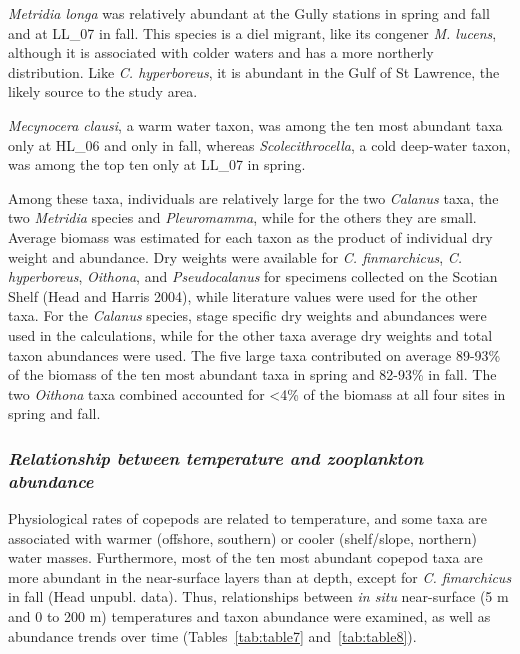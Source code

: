 \documentclass[12pt]{article}\usepackage[]{graphicx}\usepackage[]{color}
\begin{document}
\emph{Metridia longa} was relatively abundant at the Gully stations in spring and fall and at LL\_07 in fall. This species is a diel migrant, like its congener \emph{M. lucens}, although it is associated with colder waters and has a more northerly distribution. Like \emph{C. hyperboreus}, it is abundant in the Gulf of St Lawrence, the likely source to the study area.

\emph{Mecynocera clausi}, a warm water taxon, was among the ten most abundant taxa only at HL\_06 and only in fall, whereas \emph{Scolecithrocella}, a cold deep-water taxon, was among the top ten only at LL\_07 in spring.

Among these taxa, individuals are relatively large for the two \emph{Calanus} taxa, the two \emph{Metridia} species and \emph{Pleuromamma}, while for the others they are small. Average biomass was estimated for each taxon as the product of individual dry weight and abundance. Dry weights were available for \emph{C. finmarchicus}, \emph{C. hyperboreus}, \emph{Oithona}, and \emph{Pseudocalanus} for specimens collected on the Scotian Shelf (Head and Harris 2004), while literature values were used for the other taxa. For the \emph{Calanus} species, stage specific dry weights and abundances were used in the calculations, while for the other taxa average dry weights and total taxon abundances were used. The five large taxa contributed on average 89-93\% of the biomass of the ten most abundant taxa in spring and 82-93\% in fall. The two \emph{Oithona} taxa combined accounted for \textless4\% of the biomass at all four sites in spring and fall.

\hypertarget{relationship-between-temperature-and-zooplankton-abundance}{%
\subsubsection{\texorpdfstring{\emph{Relationship between temperature and zooplankton abundance}}{Relationship between temperature and zooplankton abundance}}\label{relationship-between-temperature-and-zooplankton-abundance}}

Physiological rates of copepods are related to temperature, and some taxa are associated with warmer (offshore, southern) or cooler (shelf/slope, northern) water masses. Furthermore, most of the ten most abundant copepod taxa are more abundant in the near-surface layers than at depth, except for \emph{C. fimarchicus} in fall (Head unpubl. data). Thus, relationships between \emph{in situ} near-surface (5 m and 0 to 200 m) temperatures and taxon abundance were examined, as well as abundance trends over time (Tables~\ref{tab:table7} and~\ref{tab:table8}).
\end{document}
